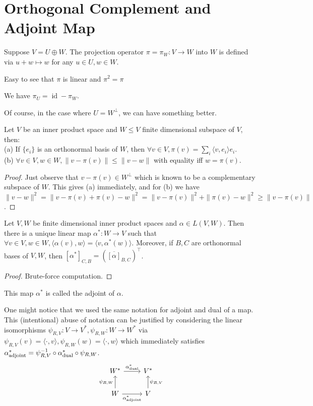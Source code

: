 \section{Orthogonal Complement and Adjoint Map}
\begin{definition}
    Suppose $V=U\oplus W$.
    The projection operator $\pi=\pi_W:V\to W$ into $W$ is defined via $u+w\mapsto w$ for any $u\in U,w\in W$.
\end{definition}
Easy to see that $\pi$ is linear and $\pi^2=\pi$
\begin{remark}
    We have $\pi_U=\operatorname{id}-\pi_W$.
\end{remark}
Of course, in the case where $U=W^\perp$, we can have something better.
\begin{lemma}
    Let $V$ be an inner product space and $W\le V$ finite dimensional subspace of $V$, then:\\
    (a) If $\{e_i\}$ is an orthonormal basis of $W$, then $\forall v\in V,\pi(v)=\sum_i\langle v,e_i\rangle e_i$.\\
    (b) $\forall v\in V,w\in W,\|v-\pi(v)\|\le\|v-w\|$ with equality iff $w=\pi(v)$.
\end{lemma}
\begin{proof}
    Just observe that $v-\pi(v)\in W^\perp$ which is known to be a complementary subspace of $W$.
    This gives (a) immediately, and for (b) we have $\|v-w\|^2=\|v-\pi(v)+\pi(v)-w\|^2=\|v-\pi(v)\|^2+\|\pi(v)-w\|^2\ge \|v-\pi(v)\|$.
\end{proof}
\begin{proposition}
    Let $V,W$ be finite dimensional inner product spaces and $\alpha\in L(V,W)$.
    Then there is a unique linear map $\alpha^\ast:W\to V$ such that $\forall v\in V,w\in W,\langle \alpha(v),w\rangle=\langle v,\alpha^\ast(w)\rangle$.
    Moreover, if $B,C$ are orthonormal bases of $V,W$, then $[\alpha^\ast]_{C,B}=(\overline{[\alpha]}_{B,C})^\top$.
\end{proposition}
\begin{proof}
    Brute-force computation.
\end{proof}
\begin{definition}
    This map $\alpha^\ast$ is called the adjoint of $\alpha$.
\end{definition}
\begin{remark}
    One might notice that we used the same notation for adjoint and dual of a map.
    This (intentional) abuse of notation can be justified by considering the linear isomorphisms $\psi_{R,V}:V\to V^\ast,\psi_{R,W}:W\to W^\ast$ via $\psi_{R,V}(v)=\langle \cdot,v\rangle,\psi_{R,W}(w)=\langle \cdot,w\rangle$ which immediately satisfies $\alpha^\ast_{\rm adjoint}=\psi_{R,V}^{-1}\circ\alpha^\ast_{\rm dual}\circ\psi_{R,W}$.
    \[
        \begin{tikzcd}
            W^\ast\arrow{r}{\alpha^\ast_{\rm dual}}&V^\ast\\
            W\arrow{u}{\psi_{R,W}}\arrow[swap]{r}{\alpha^\ast_{\rm adjoint}}&V\arrow[swap]{u}{\psi_{R,V}}
        \end{tikzcd}
    \]
\end{remark}
